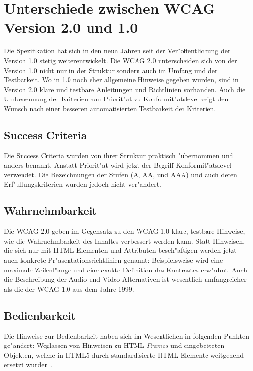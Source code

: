 \documentclass[a4paper,bibtotoc,oneside]{scrbook}
\begin{document}
\section{Unterschiede zwischen WCAG Version 2.0 und 1.0}
Die Spezifikation hat sich in den neun Jahren seit der Ver"offentlichung der Version 1.0 stetig weiterentwickelt. Die WCAG 2.0 unterscheiden sich von der Version 1.0 nicht nur in der Struktur sondern auch im Umfang und der Testbarkeit. Wo in 1.0 noch eher allgemeine Hinweise gegeben wurden, sind in Version 2.0 klare und testbare Anleitungen und Richtlinien vorhanden. Auch die Umbenennung der Kriterien von Priorit"at zu Konformit"atslevel zeigt den Wunsch nach einer besseren automatisierten Testbarkeit der Kriterien. \cite[Abschnitt Introduction]{wcag2}

\subsection{Success Criteria}
Die Success Criteria wurden von ihrer Struktur praktisch "ubernommen und anders benannt. Anstatt Priorit"at wird jetzt der Begriff Konformit"atslevel verwendet. Die Bezeichnungen der Stufen (A, AA, und AAA) und auch deren Erf"ullungskriterien wurden jedoch nicht ver"andert.

\subsection{Wahrnehmbarkeit}
Die WCAG 2.0 geben im Gegensatz zu den WCAG 1.0 klare, testbare Hinweise, wie die Wahrnehmbarkeit des Inhaltes verbessert werden kann. Statt Hinweisen, die sich nur mit HTML Elementen und Attributen besch"aftigen werden jetzt auch konkrete Pr"asentationsrichtlinien genannt: Beispielsweise wird eine maximale Zeilenl"ange und eine exakte Definition des Kontrastes erw"ahnt. Auch die Beschreibung der Audio und Video Alternativen ist wesentlich umfangreicher als die der WCAG 1.0 aus dem Jahre 1999.

\subsection{Bedienbarkeit}
Die Hinweise zur Bedienbarkeit haben sich im Wesentlichen in folgenden Punkten ge"andert: Weglassen von Hinweisen zu HTML \emph{Frames} und eingebetteten Objekten, welche in HTML5 durch standardisierte HTML Elemente weitgehend ersetzt wurden \cite [Abschnitt audio und video element]{html5}.
\end{document}

